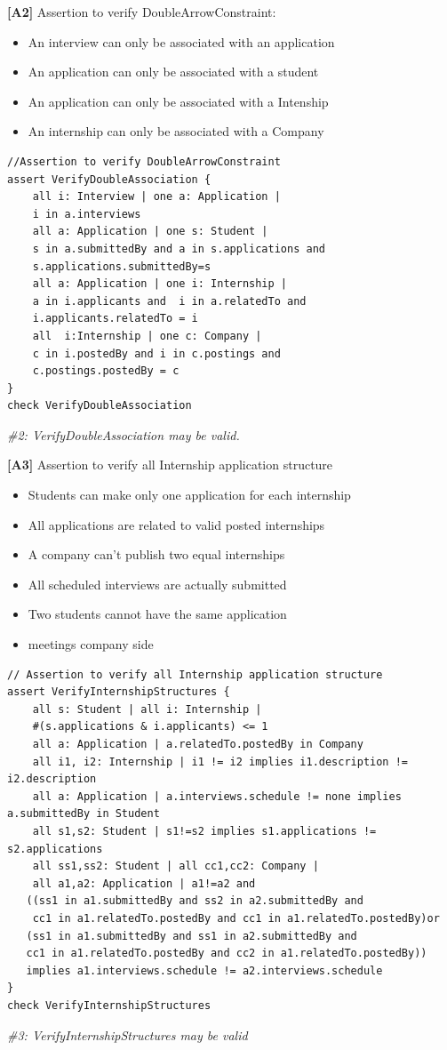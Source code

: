 \textbf{[A2]} Assertion to verify DoubleArrowConstraint:
\begin{itemize}
    \item An interview can only be associated with an application
    \item An application can only be associated with a student
    \item An application can only be associated with a Intenship
    \item An internship can only be associated with a Company
\end{itemize}
\begin{lstlisting}
//Assertion to verify DoubleArrowConstraint
assert VerifyDoubleAssociation {
    all i: Interview | one a: Application | 
    i in a.interviews
    all a: Application | one s: Student | 
    s in a.submittedBy and a in s.applications and
    s.applications.submittedBy=s
    all a: Application | one i: Internship | 
    a in i.applicants and  i in a.relatedTo and
    i.applicants.relatedTo = i
    all  i:Internship | one c: Company | 
    c in i.postedBy and i in c.postings and 
    c.postings.postedBy = c  
}
check VerifyDoubleAssociation
\end{lstlisting}
\textit{\#2: VerifyDoubleAssociation may be valid.}

\textbf{[A3]} Assertion to verify all Internship application structure
\begin{itemize}
    \item Students can make only one application for each internship
    \item All applications are related to valid posted internships
    \item A company can't publish two equal internships 
    \item All scheduled interviews are actually submitted
    \item Two students cannot have the same application
    \item meetings company side
\end{itemize}
\begin{lstlisting}
// Assertion to verify all Internship application structure
assert VerifyInternshipStructures {
    all s: Student | all i: Internship | 
    #(s.applications & i.applicants) <= 1
    all a: Application | a.relatedTo.postedBy in Company
    all i1, i2: Internship | i1 != i2 implies i1.description != i2.description
    all a: Application | a.interviews.schedule != none implies a.submittedBy in Student
    all s1,s2: Student | s1!=s2 implies s1.applications != s2.applications
    all ss1,ss2: Student | all cc1,cc2: Company |
    all a1,a2: Application | a1!=a2 and
   ((ss1 in a1.submittedBy and ss2 in a2.submittedBy and
    cc1 in a1.relatedTo.postedBy and cc1 in a1.relatedTo.postedBy)or
   (ss1 in a1.submittedBy and ss1 in a2.submittedBy and
   cc1 in a1.relatedTo.postedBy and cc2 in a1.relatedTo.postedBy))
   implies a1.interviews.schedule != a2.interviews.schedule
}
check VerifyInternshipStructures
\end{lstlisting}
\textit{\#3: VerifyInternshipStructures may be valid}
